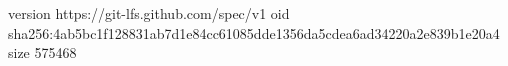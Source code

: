 version https://git-lfs.github.com/spec/v1
oid sha256:4ab5bc1f128831ab7d1e84cc61085dde1356da5cdea6ad34220a2e839b1e20a4
size 575468
